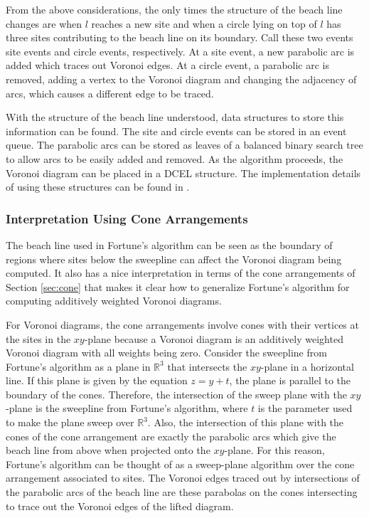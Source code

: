 \documentclass[a4paper, 11pt]{article}
\newcommand{\R}{\mathbb{R}}
\begin{document}
From the above considerations, the only times the structure of the beach line changes are when $l$ reaches a new site and when a circle lying on top
of $l$ has three sites contributing to the beach line on its boundary. Call these two events site events and circle events, respectively. At a site
event, a new parabolic arc is added which traces out Voronoi edges. At a circle event, a parabolic arc is removed, adding a vertex to the Voronoi
diagram and changing the adjacency of arcs, which causes a different edge to be traced.

With the structure of the beach line understood, data structures to store this information can be found. The site and circle events can be stored in an
event queue. The parabolic arcs can be stored as leaves of a balanced binary search tree to allow arcs to be easily added and removed. As the
algorithm proceeds, the Voronoi diagram can be placed in a DCEL structure. The implementation details of using these structures can be found in
\cite{comp_geom}.

\subsubsection{Interpretation Using Cone Arrangements}

The beach line used in Fortune's algorithm can be seen as the boundary of regions where sites below the sweepline can affect the Voronoi diagram being
computed. It also has a nice interpretation in terms of the cone arrangements of Section \ref{sec:cone} that makes it clear how to generalize Fortune's
algorithm for computing additively weighted Voronoi diagrams.

For Voronoi diagrams, the cone arrangements involve cones with their vertices at the sites in the $xy$-plane because a Voronoi diagram is an
additively weighted Voronoi diagram with all weights being zero. Consider the sweepline from Fortune's algorithm as a plane in $\R^3$ that intersects
the $xy$-plane in a horizontal line. If this plane is given by the equation $z = y + t$, the plane is parallel to the boundary of the cones.
Therefore, the intersection of the sweep plane with the $xy$-plane is the sweepline from
Fortune's algorithm, where $t$ is the parameter used to make the plane sweep over $\R^3$. Also, the intersection of this plane with the cones of the
cone arrangement are exactly the parabolic arcs which give the beach line from above when projected onto the $xy$-plane. For this reason, Fortune's algorithm can be thought of as a sweep-plane
algorithm over the cone arrangement associated to sites. The Voronoi edges traced out by intersections of the parabolic arcs of the beach line are
these parabolas on the cones intersecting to trace out the Voronoi edges of the lifted diagram.
\end{document}
